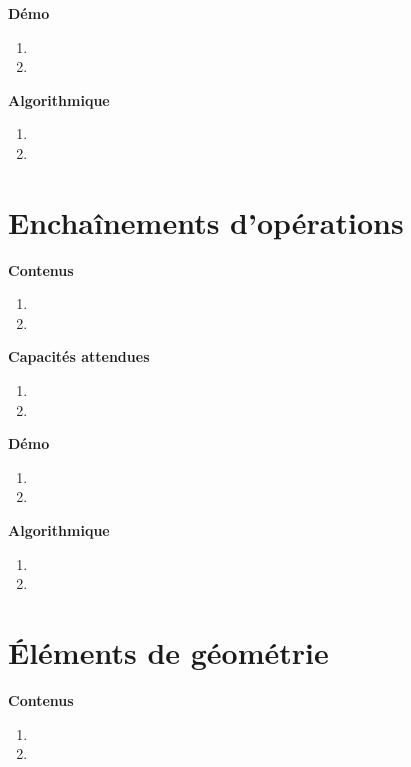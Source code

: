 \documentclass[10pt,a4paper]{article}
\begin{document}
\textbf{Démo}

\begin{enumerate}
\item 
\item 
\end{enumerate}

\textbf{Algorithmique}

\begin{enumerate}
\item 
\item 
\end{enumerate}

\section{Enchaînements d'opérations}

\textbf{Contenus}

\begin{enumerate} 
\item 
\item 
\end{enumerate}


\textbf{Capacités attendues}

\begin{enumerate}
\item 
\item 
\end{enumerate}

\textbf{Démo}

\begin{enumerate}
\item 
\item 
\end{enumerate}

\textbf{Algorithmique}

\begin{enumerate}
\item 
\item 
\end{enumerate}

\section{Éléments de géométrie}

\textbf{Contenus}

\begin{enumerate} 
\item 
\item 
\end{enumerate}
\end{document}
